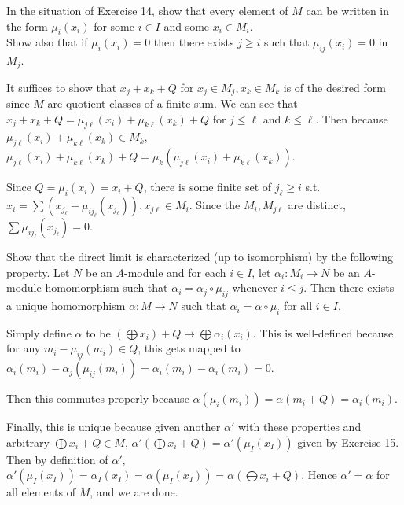 \documentclass[a4paper]{exam}
\begin{document}
\begin{questions}
	\question In the situation of Exercise 14, show that every element of $M$ can be written in the form $\mu _i(x_i)$ for some $i\in I$ and some $x_i\in M_i$.\\
	Show also that if $\mu _i(x_i) = 0$ then there exists $j \ge i$ such that $\mu _{ij}(x_i) = 0$ in $M_j$.
	\begin{solution}
		It suffices to show that $x_j + x_k + Q$ for $x_j\in M_j, x_k\in M_k$ is of the desired form since $M$ are quotient classes of a finite sum.
		We can see that $x_j + x_k + Q = \mu_{j\ell}(x_i) + \mu_{k\ell}(x_k) + Q$ for $j \le \ell$ and $k\le \ell$.
		Then because $\mu_{j\ell}(x_i) + \mu_{k\ell}(x_k)\in M_k $, $\mu_{j\ell}(x_i) + \mu_{k\ell}(x_k) + Q = \mu_k(\mu_{j\ell}(x_i) + \mu_{k\ell}(x_k))$.

		Since $Q = \mu_i(x_i) = x_i + Q $, there is some finite set of $j_\ell \ge i$ s.t. $x_i = \sum (x_{j_\ell} - \mu_{ij_\ell}(x_{j_\ell})), x_{j\ell} \in M_{i}$.
		Since the $M_i,M_{j\ell}$ are distinct, $\sum \mu _{ij_\ell}(x_{j_\ell}) = 0$.
	\end{solution}

	\question Show that the direct limit is characterized (up to isomorphism) by the following property. Let $N$ be an $A$-module and for each $i\in I $, let $\alpha _i: M_i \to N$ be an $A$-module homomorphism such that $\alpha _i = \alpha _j \circ \mu_{ij}$ whenever $i\le j$. Then there exists a unique homomorphism $\alpha :M\to N$ such that $\alpha _i = \alpha \circ \mu _i$ for all $i\in I$.
	\begin{solution}
		Simply define $\alpha$ to be $\left(\bigoplus x_i\right) + Q \mapsto \bigoplus \alpha_i(x_i)$.
		This is well-defined because for any $m_i - \mu_{ij}(m_i) \in Q $, this gets mapped to $\alpha _i(m_i) - \alpha_j(\mu _{ij}(m_i)) = \alpha _i(m_i) - \alpha _i(m_i) = 0$.

		Then this commutes properly because $\alpha (\mu _i(m_i)) = \alpha (m_i+Q) = \alpha _i(m_i)$.

		Finally, this is unique because given another $\alpha'$ with these properties and arbitrary $\bigoplus x_i +Q \in M $, $\alpha' (\bigoplus x_i+Q) = \alpha'(\mu _I(x_I))$ given by Exercise 15.
		Then by definition of $\alpha ' $, $\alpha '(\mu _I(x_I)) = \alpha_I(x_I) = \alpha(\mu _I(x_I)) = \alpha (\bigoplus x_i + Q)$.
		Hence $\alpha '= \alpha$ for all elements of $M $, and we are done.


\end{solution}
\end{questions}
\end{document}
